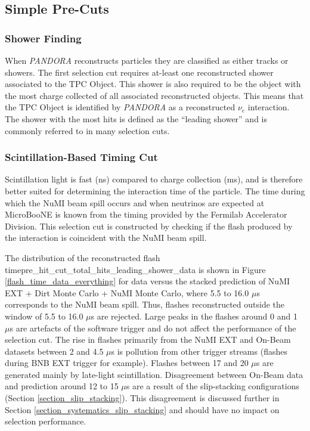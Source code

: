 \subsection{Simple Pre-Cuts}

\subsubsection{Shower Finding}

When \textit{PANDORA} reconstructs particles they are classified as either tracks or showers. The first selection cut requires at-least one reconstructed shower associated to the TPC Object. This shower is also required to be the object with the most charge collected of all associated reconstructed objects. This means that the TPC Object is identified by \textit{PANDORA} as a reconstructed $\nu_e$ interaction. The shower with the most hits is defined as the ``leading shower'' and is commonly referred to in many selection cuts. %

\subsubsection{Scintillation-Based Timing Cut} \label{section_optical_cuts}

Scintillation light is fast (ns) compared to charge collection (ms), and is therefore better suited for determining the interaction time of the particle. The time during which the NuMI beam spill occurs and when neutrinos are expected at MicroBooNE is known from the timing provided by the Fermilab Accelerator Division. This selection cut is constructed by checking if the flash produced by the interaction is coincident with the NuMI beam spill. 

The distribution of the reconstructed flash timepre_hit_cut_total_hits_leading_shower_data is shown in Figure \ref{flash_time_data_everything} for data versus the stacked prediction of NuMI EXT + Dirt Monte Carlo + NuMI Monte Carlo, where 5.5 to 16.0 $\mu$s corresponds to the NuMI beam spill. Thus, flashes reconstructed outside the window of 5.5 to 16.0 $\mu$s are rejected. Large peaks in the flashes around 0 and 1 $\mu$s are artefacts of the software trigger and do not affect the performance of the selection cut. The rise in flashes primarily from the NuMI EXT and On-Beam datasets between 2 and 4.5 $\mu$s is pollution from other trigger streams (flashes during BNB EXT trigger for example). Flashes between 17 and 20 $\mu$s are generated mainly by late-light scintillation. Disagreement between On-Beam data and prediction around 12 to 15 $\mu$s are a result of the slip-stacking configurations (Section \ref{section_slip_stacking}). This disagreement is discussed further in Section \ref{section_systematics_slip_stacking} and should have no impact on selection performance.

